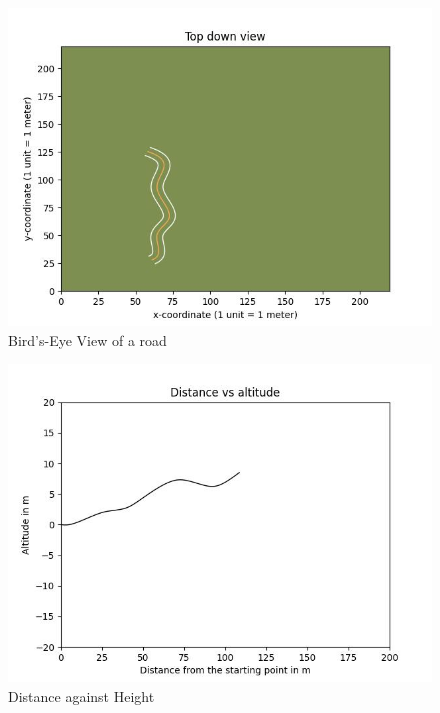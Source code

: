 \begin{figure}[!h]
    \centering
    \includegraphics[width=0.5\linewidth]{images/road.jpg}
    \caption{Bird's-Eye View of a road}
    \label{road}
\end{figure}

\begin{figure}[!h]
    \centering
    \includegraphics[width=0.5\linewidth]{images/height.jpg}
    \caption{Distance against Height}
    \label{height}
\end{figure}

